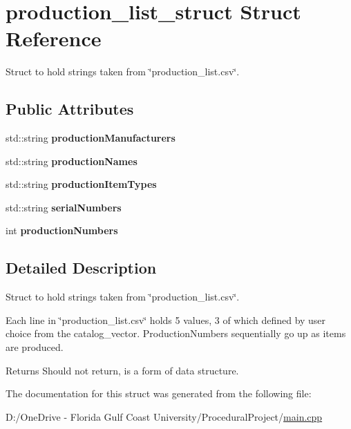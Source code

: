 \hypertarget{structproduction__list__struct}{}\section{production\+\_\+list\+\_\+struct Struct Reference}
\label{structproduction__list__struct}


Struct to hold strings taken from \char`\"{}production\+\_\+list.\+csv\char`\"{}.  


\subsection*{Public Attributes}
\begin{DoxyCompactItemize}
\item 
\mbox{\label{structproduction__list__struct_a74b74249176101c9b5884edb1306cb31}} 
std\+::string {\bfseries production\+Manufacturers}
\item 
\mbox{\label{structproduction__list__struct_a41772b4c16253b0dfc88850024b01e71}} 
std\+::string {\bfseries production\+Names}
\item 
\mbox{\label{structproduction__list__struct_ab5717e5dafd701085c8fdf0222a7d381}} 
std\+::string {\bfseries production\+Item\+Types}
\item 
\mbox{\label{structproduction__list__struct_a25e231a772c4864d7360842c7209b9cc}} 
std\+::string {\bfseries serial\+Numbers}
\item 
\mbox{\label{structproduction__list__struct_a607ed3ee230e9aa2af7493d68027613c}} 
int {\bfseries production\+Numbers}
\end{DoxyCompactItemize}


\subsection{Detailed Description}
Struct to hold strings taken from \char`\"{}production\+\_\+list.\+csv\char`\"{}. 

Each line in \char`\"{}production\+\_\+list.\+csv\char`\"{} holds 5 values, 3 of which defined by user choice from the catalog\+\_\+vector. Production\+Numbers sequentially go up as items are produced.

\begin{DoxyReturn}{Returns}
Should not return, is a form of data structure. 
\end{DoxyReturn}


The documentation for this struct was generated from the following file\+:\begin{DoxyCompactItemize}
\item 
D\+:/\+One\+Drive -\/ Florida Gulf Coast University/\+Procedural\+Project/\mbox{\hyperlink{main_8cpp}{main.\+cpp}}\end{DoxyCompactItemize}
